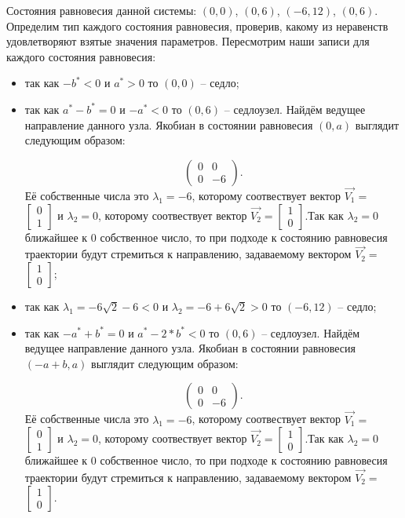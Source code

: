 Состояния равновесия данной системы: $(0, 0)$, $(0, 6)$, $(-6, 12)$, $(0, 6)$. Определим тип каждого состояния равновесия, проверив, какому из неравенств удовлетворяют взятые значения параметров.  Пересмотрим наши записи для каждого состояния равновесия: 
\begin{itemize}
	\item{ так как $-b^\ast  < 0 $ и $a^\ast > 0 $ то $(0, 0)$ -- седло;}
	\item{ так как $a^\ast - b^\ast = 0 $ и $-a^\ast  < 0 $ то $(0, 6)$ -- седлоузел. Найдём ведущее направление данного узла. Якобиан в состоянии равновесия $(0, a)$ выглядит следующим образом:
		
		$$\begin{pmatrix}0 & 0\\0 & -6\end{pmatrix}. $$Её собственные числа это $\lambda_1=-6$, которому соотвествует вектор $\Vec{V_1}=$ $\left[\begin{matrix}0\\1\end{matrix}\right]$ и $\lambda_2=0$, которому соотвествует вектор $\Vec{V_2}=$$\left[\begin{matrix}1\\0\end{matrix}\right]$.Так как $\lambda_2=0$ ближайшее к $0$ собственное число, то при подходе к состоянию равновесия траектории будут стремиться к направлению, задаваемому вектором $\Vec{V_2}=$ $\left[\begin{matrix}1\\0\end{matrix}\right]$;}
	\item{ так как ${\lambda_{1}} = - 6 \sqrt{2} - 6$$  < 0 $ и ${\lambda_{2}} = -6 + 6 \sqrt{2}$$ > 0 $ то $(-6, 12)$ -- седло;}
	\item{ так как $-a^\ast + b^\ast = 0 $ и $a^\ast - 2*b^\ast  < 0 $ то $(0, 6)$ -- седлоузел. Найдём ведущее направление данного узла. Якобиан в состоянии равновесия $(-a + b, a)$ выглядит следующим образом:
		
		$$\begin{pmatrix}0 & 0\\0 & -6\end{pmatrix}. $$Её собственные числа это $\lambda_1=-6$, которому соотвествует вектор $\Vec{V_1}=$ $\left[\begin{matrix}0\\1\end{matrix}\right]$ и $\lambda_2=0$, которому соотвествует вектор $\Vec{V_2}=$$\left[\begin{matrix}1\\0\end{matrix}\right]$.Так как $\lambda_2=0$ ближайшее к $0$ собственное число, то при подходе к состоянию равновесия траектории будут стремиться к направлению, задаваемому вектором $\Vec{V_2}=$ $\left[\begin{matrix}1\\0\end{matrix}\right]$.}
\end{itemize} 

